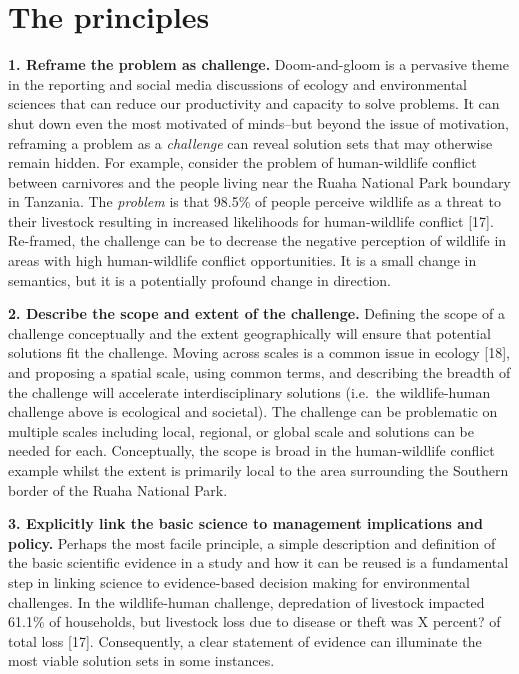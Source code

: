 \documentclass[10pt,letterpaper]{article}
\begin{document}
\section{The principles}\label{the-principles}

\textbf{1. Reframe the problem as challenge.} Doom-and-gloom is a
pervasive theme in the reporting and social media discussions of ecology
and environmental sciences that can reduce our productivity and capacity
to solve problems. It can shut down even the most motivated of
minds--but beyond the issue of motivation, reframing a problem as a
\emph{challenge} can reveal solution sets that may otherwise remain
hidden. For example, consider the problem of human-wildlife conflict
between carnivores and the people living near the Ruaha National Park
boundary in Tanzania. The \emph{problem} is that 98.5\% of people
perceive wildlife as a threat to their livestock resulting in increased
likelihoods for human-wildlife conflict {[}17{]}. Re-framed, the
challenge can be to decrease the negative perception of wildlife in
areas with high human-wildlife conflict opportunities. It is a small
change in semantics, but it is a potentially profound change in
direction.

\textbf{2. Describe the scope and extent of the challenge.} Defining the
scope of a challenge conceptually and the extent geographically will
ensure that potential solutions fit the challenge. Moving across scales
is a common issue in ecology {[}18{]}, and proposing a spatial scale,
using common terms, and describing the breadth of the challenge will
accelerate interdisciplinary solutions (i.e.~the wildlife-human
challenge above is ecological and societal). The challenge can be
problematic on multiple scales including local, regional, or global
scale and solutions can be needed for each. Conceptually, the scope is
broad in the human-wildlife conflict example whilst the extent is
primarily local to the area surrounding the Southern border of the Ruaha
National Park.

\textbf{3. Explicitly link the basic science to management implications
and policy.} Perhaps the most facile principle, a simple description and
definition of the basic scientific evidence in a study and how it can be
reused is a fundamental step in linking science to evidence-based
decision making for environmental challenges. In the wildlife-human
challenge, depredation of livestock impacted 61.1\% of households, but
livestock loss due to disease or theft was X percent? of total loss
{[}17{]}. Consequently, a clear statement of evidence can illuminate the
most viable solution sets in some instances.
\end{document}
